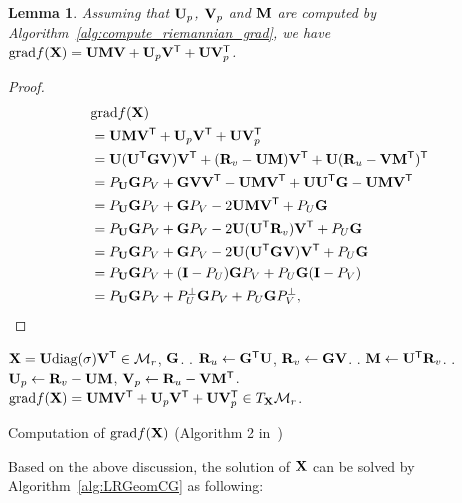 \documentclass[10pt,twocolumn,letterpaper]{article}
\newtheorem{lemma}{Lemma}
\def\M{\mathcal{M}}
\def\bR{{\bf R}}
\def\U{{\bf U}}
\def\V{{\bf V}}
\def\diag{\mbox{diag}}
\def\trsp{{\sf T}}
\def\G{{\bf G}}
\def\grad{{\text{grad}}}
\def\bM{{\bf M}}
\def\bI{{\bf I}}
\def\bX{{\bf X}}
\def\bI{{\bf I}}
\def\bX{{\bf X}}
\begin{document}
\begin{lemma}
  Assuming that $\U_{p}$, $\V_{p}$ and $\bM$ are computed by Algorithm~\ref{alg:compute_riemannian_grad},
  we have {\small${\textnormal{grad}} f(\bX) = \U \bM \V + \U_{p} \V^{\trsp} + \U \V^{\trsp}_{p}$}.
\end{lemma}

{\small
\begin{proof}
\begin{align}
\label{eq:proof_lemma1}
       & \grad f(\bX) \\
       & = \U \bM \V^{\trsp} + \U_{p} \V^{\trsp} + \U \V_{p}^{\trsp}  \nonumber \\
       & = \U(\U^{\trsp} \G \V) \V^{\trsp} + (\bR_{v} - \U \bM) \V^{\trsp} + \U (\bR_{u} - \V \bM^{\trsp})^{\trsp} \nonumber \\
       & = P_{\U} \G P_{V} + \G \V \V^{\trsp} - \U \bM \V^{\trsp} + \U \U^{\trsp} \G - \U \bM \V^{\trsp} \nonumber \\
       & = P_{\U} \G P_{V} + \G P_{V} - 2\U \bM \V^{\trsp} + P_{U} \G  \nonumber \\
       & = P_{\U} \G P_{V} + \G P_{V} - 2\U (\U^{\trsp} \bR_{v}) \V^{\trsp} + P_{U} \G  \nonumber \\
       & = P_{\U} \G P_{V} + \G P_{V} - 2\U (\U^{\trsp} \G \V) \V^{\trsp} + P_{U} \G  \nonumber \\
       & = P_{\U} \G P_{V} + (\bI - P_{U}) \G P_{V} + P_{U} \G (\bI - P_{V})  \nonumber \\
       & = P_{\U} \G P_{V} + P_{U}^{\perp} \G P_{V} + P_{U} \G P_{V}^{\perp}  ,
\end{align}
\end{proof}
}

\begin{algorithm}
  \begin{algorithmic}
    \REQUIRE $\bX = \U \diag(\sigma) \V^{\trsp} \in \M_{r}$, $\G$.
    . $\bR_{u} \leftarrow \G^{\trsp} \U$, $\bR_{v} \leftarrow \G \V$.   
    . $\bM \leftarrow \U^{\trsp} \bR_{v}$.    
    . $\U_{p} \leftarrow \bR_{v} - \U \bM$, $\V_{p} \leftarrow \bR_{u} - \V \bM^{\trsp}$.
    \ENSURE $\grad f(\bX) = \U \bM \V^{\trsp} + \U_{p} \V^{\trsp} + \U \V_{p}^{\trsp} \in T_{\bX}\M_{r}$.    
  \end{algorithmic}
  \caption{Computation of $\grad f(\bX)$ (Algorithm 2 in~\cite{vandereycken2013lowrank})}
  \label{alg:compute_riemannian_grad}
\end{algorithm}

Based on the above discussion, the solution of $\bX$ can be solved by Algorithm~\ref{alg:LRGeomCG} as following:
\end{document}

